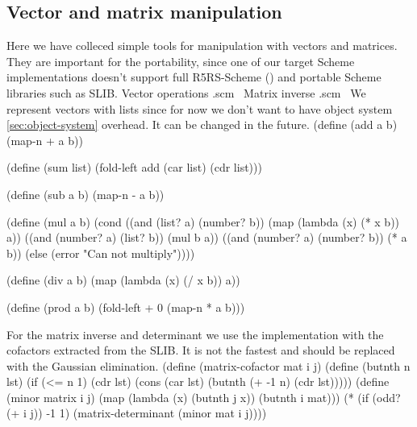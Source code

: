 \documentclass[a4paper,10pt]{article}%
\theoremstyle{definition} \newtheorem{Def}{Definition}
\begin{document}
\nwendcode{}\nwdocspar

\subsection{Vector and matrix manipulation}
\label{sec:vect-matr-manip}
Here we have colleced simple tools for manipulation with vectors and matrices. They are important for the portability, since one of our target Scheme implementations doesn't support full R5RS-Scheme (\cite{R5RS}) and portable Scheme libraries such as SLIB. 
\nwenddocs{}\endmoddef\nwstartdeflinemarkup{}\nwenddeflinemarkup
\LA{}Vector operations .scm~{\nwtagstyle{}}\RA{}
\LA{}Matrix inverse .scm~{\nwtagstyle{}}\RA{}
\nwendcode{}\nwdocspar
We represent vectors with lists since for now we don't want to have object system \ref{sec:object-system} overhead. It can be changed in the future.
\nwenddocs{}\endmoddef\nwstartdeflinemarkup{}\nwenddeflinemarkup
(define (add a b)
  (map-n + a b))

(define (sum list)
  (fold-left add (car list) (cdr list)))

(define (sub a b)
  (map-n - a b))

(define (mul a b)
  (cond ((and (list? a) (number? b)) (map (lambda (x) (* x b)) a))
        ((and (number? a) (list? b)) (mul b a))
        ((and (number? a) (number? b)) (* a b))
        (else (error "Can not multiply"))))

(define (div a b)
  (map (lambda (x) (/ x b)) a))
  
(define (prod a b)
  (fold-left + 0 (map-n * a b)))
\nwendcode{}\nwdocspar

For the matrix inverse and determinant we use the implementation with the cofactors extracted from the SLIB. It is not the fastest and should be replaced with the Gaussian elimination.
\nwenddocs{}\endmoddef\nwstartdeflinemarkup{}\nwenddeflinemarkup
(define (matrix-cofactor mat i j)
  (define (butnth n lst)
    (if (<= n 1)
        (cdr lst)
        (cons (car lst)
              (butnth (+ -1 n) (cdr lst)))))
  (define (minor matrix i j)
    (map (lambda (x)
           (butnth j x))
         (butnth i mat)))
  (* (if (odd? (+ i j)) -1 1)
     (matrix-determinant (minor mat i j))))
\end{document}
